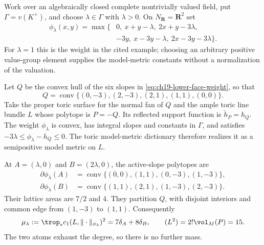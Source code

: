 \begin{example}
\label{ex:ch19-toric-lower-face}
Work over an algebraically closed complete nontrivially valued field,
put $\Gamma=v(K^\times)$, and choose $\lambda\in\Gamma$ with
$\lambda>0$.  On $N_{\mathbf R}=\mathbf R^2$ set
\begin{equation}
\label{eq:ch19-lower-face-weight}
\begin{aligned}
 \phi_\lambda(x,y)=\max\{&0,\ x+y-\lambda,\ 2x+y-3\lambda,\\
                       &-3y,\ x-3y-\lambda,\ 2x-3y-3\lambda\}.
\end{aligned}
\end{equation}
For $\lambda=1$ this is the weight in the cited example; choosing an
arbitrary positive value-group element supplies the model-metric
constants without a normalization of the valuation.

Let $Q$ be the convex hull of the six slopes in
\eqref{eq:ch19-lower-face-weight}, so that
\[
 Q=\operatorname{conv}\{(0,-3),(2,-3),(2,1),(1,1),(0,0)\}.
\]
Take the proper toric surface for the normal fan of $Q$ and the ample
toric line bundle $L$ whose polytope is $P=-Q$.  Its reflected support
function is $\check h_P=h_Q$.  The weight $\phi_\lambda$ is convex,
has integral slopes and constants in $\Gamma$, and satisfies
$-3\lambda\leq\phi_\lambda-h_Q\leq0$.  The toric model-metric
dictionary therefore realizes it as a semipositive model metric on $L$.

At $A=(\lambda,0)$ and $B=(2\lambda,0)$, the active-slope polytopes are
\begin{equation}
\label{eq:ch19-lower-face-subgradients}
\begin{aligned}
 \partial\phi_\lambda(A)
   &=\operatorname{conv}\{(0,0),(1,1),(0,-3),(1,-3)\},\\
 \partial\phi_\lambda(B)
   &=\operatorname{conv}\{(1,1),(2,1),(1,-3),(2,-3)\}.
\end{aligned}
\end{equation}
Their lattice areas are $7/2$ and $4$.  They partition $Q$, with
disjoint interiors and common edge from $(1,-3)$ to $(1,1)$.
Consequently
\begin{equation}
\label{eq:ch19-lower-face-ambient-measure}
 \mu_\lambda:=\trop_*c_1(L,\|\cdot\|_{\phi_\lambda})^2
      =7\delta_A+8\delta_B,
 \qquad (L^2)=2!\vol_M(P)=15.
\end{equation}
The two atoms exhaust the degree, so there is no further mass.


\end{example}
